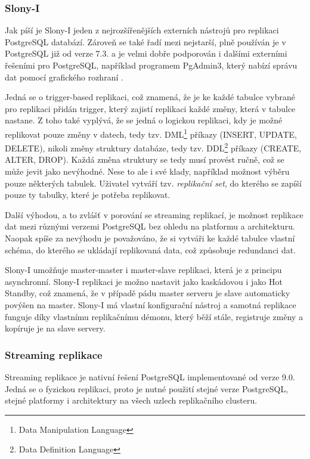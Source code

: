       \subsubsection{Slony-I}
      \label{kSlony}

      Jak píší \cite{Boszormenyi2013} je Slony-I jeden z nejrozšířenějších externích nástrojů pro replikaci PostgreSQL databází. Zároveň se také řadí mezi nejstarší, plně používán je v PostgreSQL již od verze 7.3. a je velmi dobře podporován i dalšími externími řešeními pro PostgreSQL, například programem PgAdmin3, který nabízí správu dat pomocí grafického rozhraní \citep{Boszormenyi2013}.

      Jedná se o trigger-based replikaci, což znamená, že je ke každé tabulce vybrané pro replikaci přidán trigger, který zajistí replikaci každé změny, která v tabulce nastane. Z toho také vyplývá, že se jedná o logickou replikaci, kdy je možné replikovat pouze změny v datech, tedy tzv. DML\footnote{Data Manipulation Language} příkazy (INSERT, UPDATE, DELETE), nikoli změny struktury databáze, tedy tzv. DDL\footnote{Data Definition Language} příkazy (CREATE, ALTER, DROP). Každá změna struktury se tedy musí provést ručně, což se může jevit jako nevýhodné. Nese to ale i své klady, například možnost výběru pouze některých tabulek. Uživatel vytváří tzv. {\it replikační set}, do kterého se zapíší pouze ty tabulky, které je potřeba replikovat. 

Další výhodou, a to zvlášť v porování se streaming replikací, je možnost replikace dat mezi různými verzemi PostgreSQL bez ohledu na platformu a architekturu. Naopak spíše za nevýhodu je považováno, že si vytváři ke každé tabulce vlastní schéma, do kterého se ukládají replikovaná data, což způsobuje redundanci dat. 

  Slony-I umožňuje master-master i master-slave replikaci, která je z principu asynchronní. 
  Slony-I replikaci je možno nastavit jako kaskádovou i jako Hot Standby, což
  znamená, že v případě pádu master serveru je slave automaticky povýšen na
  master. Slony-I má vlastní konfigurační nástroj a samotná replikace funguje
  díky vlastnímu replikačnímu démonu, který běží stále, registruje změny a
  kopíruje je na slave servery.

  \subsubsection{Streaming replikace}
  \label{kStreamingTeorie}

  Streaming replikace je nativní řešení PostgreSQL implementované od verze
  9.0. Jedná se o fyzickou replikaci, proto je nutné použití stejné verze
  PostgreSQL, stejné platformy i architektury na všech uzlech replikačního
  clusteru. 
  
